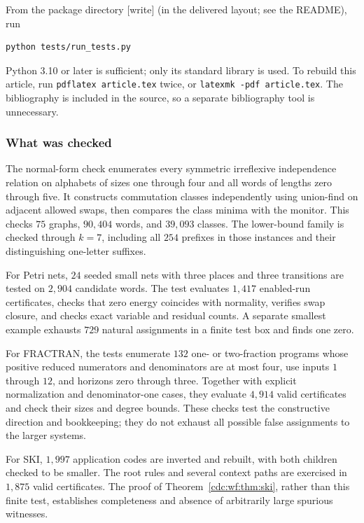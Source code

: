 \documentclass[11pt,a4paper]{article}
\theoremstyle{definition}
\theoremstyle{remark}
\newcommand{\wtag}{\textup{[write]}}%
\begin{document}
From the package directory \wtag{} (in the delivered layout; see the README), run
\begin{verbatim}
python tests/run_tests.py
\end{verbatim}
Python 3.10 or later is sufficient; only its standard library is used. To rebuild this article, run \texttt{pdflatex article.tex} twice, or \texttt{latexmk -pdf article.tex}. The bibliography is included in the source, so a separate bibliography tool is unnecessary.

\subsubsection{What was checked}
The normal-form check enumerates every symmetric irreflexive independence relation on alphabets of sizes one through four and all words of lengths zero through five. It constructs commutation classes independently using union-find on adjacent allowed swaps, then compares the class minima with the monitor. This checks $75$ graphs, $90{,}404$ words, and $39{,}093$ classes. The lower-bound family is checked through $k=7$, including all $254$ prefixes in those instances and their distinguishing one-letter suffixes.

For Petri nets, $24$ seeded small nets with three places and three transitions are tested on $2{,}904$ candidate words. The test evaluates $1{,}417$ enabled-run certificates, checks that zero energy coincides with normality, verifies swap closure, and checks exact variable and residual counts. A separate smallest example exhausts $729$ natural assignments in a finite test box and finds one zero.

For FRACTRAN, the tests enumerate $132$ one- or two-fraction programs whose positive reduced numerators and denominators are at most four, use inputs $1$ through $12$, and horizons zero through three. Together with explicit normalization and denominator-one cases, they evaluate $4{,}914$ valid certificates and check their sizes and degree bounds. These checks test the constructive direction and bookkeeping; they do not exhaust all possible false assignments to the larger systems.

For SKI, $1{,}997$ application codes are inverted and rebuilt, with both children checked to be smaller. The root rules and several context paths are exercised in $1{,}875$ valid certificates. The proof of Theorem~\ref{cdc:wf:thm:ski}, rather than this finite test, establishes completeness and absence of arbitrarily large spurious witnesses.
\end{document}
